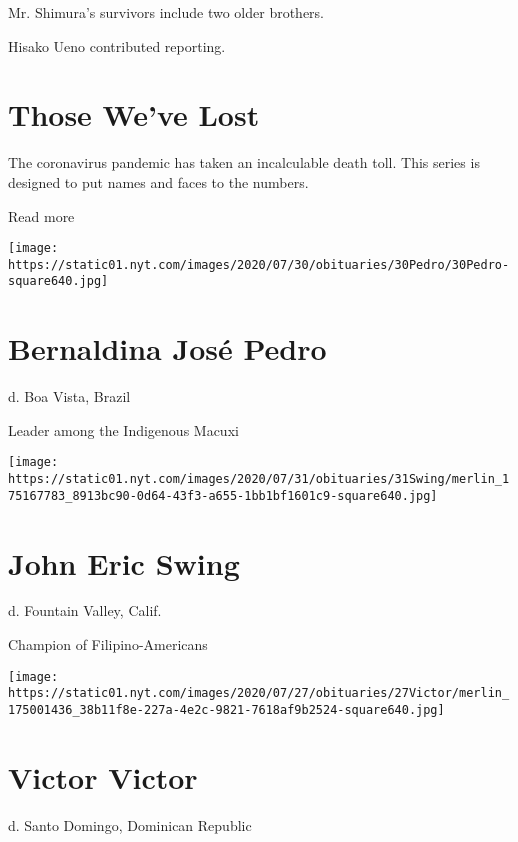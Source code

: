 Mr. Shimura's survivors include two older brothers.

Hisako Ueno contributed reporting.

\href{https://www.nytimes.com/interactive/2020/obituaries/people-died-coronavirus-obituaries.html?action=click\&pgtype=Article\&state=default\&region=BELOW_MAIN_CONTENT\&context=covid_obits_promo}{}

\hypertarget{those-weve-lost}{%
\section{Those We've Lost}\label{those-weve-lost}}

The coronavirus pandemic has taken an incalculable death toll. This
series is designed to put names and faces to the numbers.

Read more

\texttt{[image: https://static01.nyt.com/images/2020/07/30/obituaries/30Pedro/30Pedro-square640.jpg]}

\hypertarget{bernaldina-josuxe9-pedro}{%
\section{Bernaldina José Pedro}\label{bernaldina-josuxe9-pedro}}

d. Boa Vista, Brazil

Leader among the Indigenous Macuxi

\texttt{[image: https://static01.nyt.com/images/2020/07/31/obituaries/31Swing/merlin\_175167783\_8913bc90-0d64-43f3-a655-1bb1bf1601c9-square640.jpg]}

\hypertarget{john-eric-swing}{%
\section{John Eric Swing}\label{john-eric-swing}}

d. Fountain Valley, Calif.

Champion of Filipino-Americans

\texttt{[image: https://static01.nyt.com/images/2020/07/27/obituaries/27Victor/merlin\_175001436\_38b11f8e-227a-4e2c-9821-7618af9b2524-square640.jpg]}

\hypertarget{victor-victor}{%
\section{Victor Victor}\label{victor-victor}}

d. Santo Domingo, Dominican Republic

